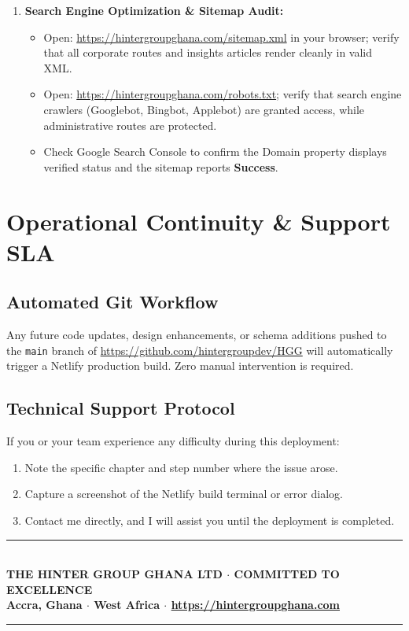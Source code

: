 \documentclass[11pt,a4paper,oneside]{book}
\begin{document}
\begin{enumerate}[leftmargin=*,label=\textbf{\arabic*.}]
  \item \textbf{Search Engine Optimization \& Sitemap Audit:}
    \begin{itemize}
      \item Open: \url{https://hintergroupghana.com/sitemap.xml} in your browser; verify that all corporate routes and insights articles render cleanly in valid XML.
      \item Open: \url{https://hintergroupghana.com/robots.txt}; verify that search engine crawlers (Googlebot, Bingbot, Applebot) are granted access, while administrative routes are protected.
      \item Check Google Search Console to confirm the Domain property displays verified status and the sitemap reports \textbf{Success}.
    \end{itemize}
\end{enumerate}

\chapter{Operational Continuity \& Support SLA}
\label{chap:support}

\section{Automated Git Workflow}
Any future code updates, design enhancements, or schema additions pushed to the \texttt{main} branch of \url{https://github.com/hintergroupdev/HGG} will automatically trigger a Netlify production build. Zero manual intervention is required.

\section{Technical Support Protocol}
If you or your team experience any difficulty during this deployment:
\begin{enumerate}
  \item Note the specific chapter and step number where the issue arose.
  \item Capture a screenshot of the Netlify build terminal or error dialog.
  \item Contact me directly, and I will assist you until the deployment is completed.
\end{enumerate}

\vfill

\begin{center}
  {\color{HGGGold}\rule{0.6\textwidth}{1.2pt}}\\[0.3cm]
  \small\bfseries\color{HGGNavy}THE HINTER GROUP GHANA LTD $\cdot$ COMMITTED TO EXCELLENCE\\[0.1cm]
  \footnotesize\color{HGGMutedText}Accra, Ghana $\cdot$ West Africa $\cdot$ \url{https://hintergroupghana.com}\\[0.3cm]
  {\color{HGGGold}\rule{0.6\textwidth}{1.2pt}}
\end{center}
\end{document}
